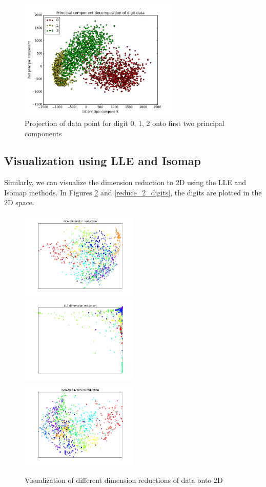 \documentclass[11pt]{article}
\begin{document}
\begin{figure}[H]
\begin{center}
\includegraphics[width=3in]{pca_012.png}
\caption{Projection of data point for digit 0, 1, 2 onto first two principal components}
\label{pca_012}
\end{center}
\end{figure}

\subsection*{Visualization using LLE and Isomap}
Similarly, we can visualize the dimension reduction to 2D using the LLE and Isomap methods. In Figures \ref{reduce_all_digits} and \ref{reduce_2_digits}, the digits are plotted in the 2D space.

\begin{figure}[H]
\begin{center}
\includegraphics[width=2.2in]{pca_new.png}
\includegraphics[width=2.2in]{lle_new.png}
\includegraphics[width=2.2in]{isomap_new.png}
\end{center}
\caption{Visualization of different dimension reductions of data onto 2D}
\label{reduce_all_digits}
\end{figure}
\end{document}
